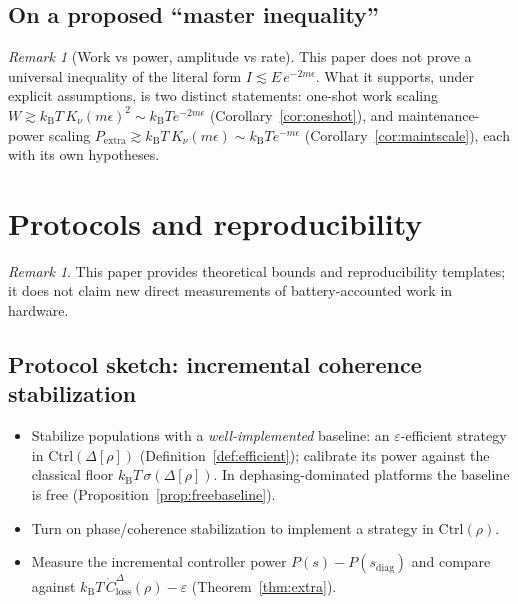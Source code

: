 \documentclass[11pt,a4paper]{article}
\theoremstyle{plain}
\theoremstyle{definition}
\theoremstyle{remark}
\newtheorem{remark}[theorem]{Remark}
\newcommand{\kB}{k_{\mathrm{B}}}
\newcommand{\Ctrl}{\mathrm{Ctrl}}
\newcommand{\Pextra}{P_{\mathrm{extra}}}
\newcommand{\Closs}{\dot{C}^{\Delta}_{\mathrm{loss}}}
\begin{document}
\subsection{On a proposed ``master inequality''}

\begin{remark}[Work vs power, amplitude vs rate]
This paper does not prove a universal inequality of the literal form
$I \lesssim E\, e^{-2m\epsilon}$. What it supports, under explicit assumptions,
is two distinct statements: one-shot work scaling
$W \gtrsim \kB T\, K_\nu(m\epsilon)^2 \sim \kB T e^{-2m\epsilon}$
(Corollary~\ref{cor:oneshot}), and maintenance-power scaling
$\Pextra \gtrsim \kB T\, K_\nu(m\epsilon) \sim \kB T e^{-m\epsilon}$
(Corollary~\ref{cor:maintscale}), each with its own hypotheses.
\end{remark}

\section{Protocols and reproducibility}

\begin{remark}
This paper provides theoretical bounds and reproducibility templates; it does
not claim new direct measurements of battery-accounted work in hardware.
\end{remark}

\subsection{Protocol sketch: incremental coherence stabilization}

\begin{itemize}
\item[(P1)] Stabilize populations with a \emph{well-implemented} baseline: an
$\varepsilon$-efficient strategy in $\Ctrl(\Delta[\rho])$
(Definition~\ref{def:efficient}); calibrate its power against the classical
floor $\kB T\,\sigma(\Delta[\rho])$. In dephasing-dominated platforms the
baseline is free (Proposition~\ref{prop:freebaseline}).
\item[(P2)] Turn on phase/coherence stabilization to implement a strategy in
$\Ctrl(\rho)$.
\item[(P3)] Measure the incremental controller power $P(s) -
P(s_{\mathrm{diag}})$ and compare against $\kB T\,\Closs(\rho) - \varepsilon$
(Theorem~\ref{thm:extra}).
\end{itemize}
\end{document}
